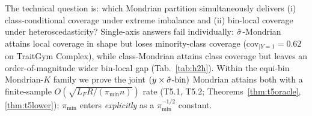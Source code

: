 The technical question is: which Mondrian partition simultaneously delivers (i) class-conditional coverage under extreme imbalance and (ii) bin-local coverage under heteroscedasticity?
Single-axis answers fail individually: $\hat{\sigma}$-Mondrian \citep{bostrom2020mondrian} attains local coverage in shape but loses minority-class coverage ($\mathrm{cov}_{|Y=1} = 0.62$ on TraitGym Complex), while class-Mondrian \citep{sadinle2019lac} attains class coverage but leaves an order-of-magnitude wider bin-local gap (Tab.~\ref{tab:h2h}). Within the equi-bin Mondrian-$K$ family we prove the joint $(y \times \hat{\sigma}\text{-bin})$ Mondrian attains both with a finite-sample $O(\sqrt{L_F R / (\pi_{\min} n)})$ rate (T5.1, T5.2; Theorems~\ref{thm:t5oracle}, \ref{thm:t5lower}); $\pi_{\min}$ enters \emph{explicitly} as a $\pi_{\min}^{-1/2}$ constant.

